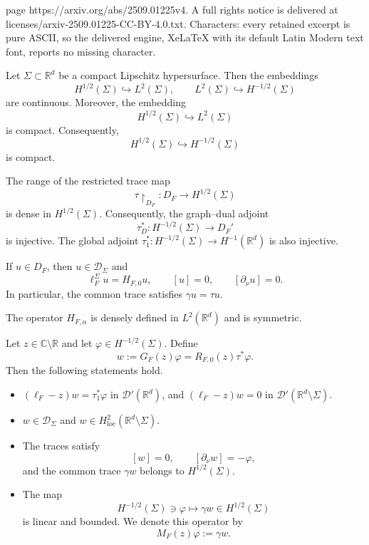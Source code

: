\documentclass[10pt,a4paper]{amsart}
\begin{document}
page https://arxiv.org/abs/2509.01225v4. A full rights notice is delivered at licenses/arxiv-2509.01225-CC-BY-4.0.txt. Characters: every retained excerpt is pure ASCII, so the delivered engine, XeLaTeX with its default Latin Modern text font, reports no missing character.
\begin{lem}\label{lem:sobolev-embeddings}
Let $\Sigma\subset\mathbb R^d$ be a compact Lipschitz hypersurface.
Then the embeddings
$$
H^{1/2}(\Sigma)\hookrightarrow L^2(\Sigma),
\qquad
L^2(\Sigma)\hookrightarrow H^{-1/2}(\Sigma)
$$
are continuous.
Moreover, the embedding
$$
H^{1/2}(\Sigma)\hookrightarrow L^2(\Sigma)
$$
is compact.
Consequently,
$$
H^{1/2}(\Sigma)\hookrightarrow H^{-1/2}(\Sigma)
$$
is compact.
\end{lem}

\begin{lem}\label{lem:tau-dense}
The range of the restricted trace map
$$
\tau\upharpoonright_{D_F}:D_F\to H^{1/2}(\Sigma)
$$
is dense in $H^{1/2}(\Sigma)$.
Consequently, the graph--dual adjoint
$$
\tau_D^*:H^{-1/2}(\Sigma)\to D_F'
$$
is injective.
The global adjoint $\tau_1^*:H^{-1/2}(\Sigma)\to H^{-1}(\mathbb R^d)$ is also injective.
\end{lem}

\begin{lem}\label{lem:free-in-transmission}
If $u\in D_F$, then $u\in\mathcal D_\Sigma$ and
$$
\ell_F^\Sigma u=H_{F,0}u,
\qquad
[u]=0,
\qquad
[\partial_\nu u]=0.
$$
In particular, the common trace satisfies $\gamma u=\tau u$.
\end{lem}

\begin{lem}\label{lem:symmetric-HFa}
The operator $H_{F,\alpha}$ is densely defined in $L^2(\mathbb R^d)$ and is symmetric.
\end{lem}

\begin{lem}\label{lem:single--layer}
Let $z\in\mathbb C\setminus\mathbb R$ and let $\varphi\in H^{-1/2}(\Sigma)$.
Define
$$
w:=G_F(z)\varphi=R_{F,0}(z)\tau^*\varphi.
$$
Then the following statements hold.
\begin{itemize}
\item[(i)]
$(\ell_F-z)w=\tau_1^*\varphi$ in $\mathcal D'(\mathbb R^d)$, and $(\ell_F-z)w=0$ in $\mathcal D'(\mathbb R^d\setminus\Sigma)$.

\item[(ii)]
$w\in\mathcal D_\Sigma$ and $w\in H^2_{\mathrm{loc}}(\mathbb R^d\setminus\Sigma)$.

\item[(iii)] The traces satisfy
$$
[w]=0,\qquad [\partial_\nu w]=-\varphi,
$$
and the common trace $\gamma w$ belongs to $H^{1/2}(\Sigma)$.

\item[(iv)] The map
$$
H^{-1/2}(\Sigma)\ni\varphi
\mapsto\gamma w\in H^{1/2}(\Sigma)
$$
is linear and bounded.
We denote this operator by
$$
M_F(z)\varphi:=\gamma w.
$$
\end{itemize}
\end{lem}
\end{document}
